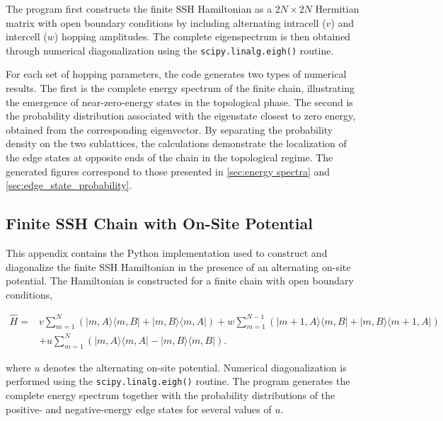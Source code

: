 \documentclass[11pt, a4paper]{article}
\begin{document}
The program first constructs the finite SSH Hamiltonian as a \(2N\times2N\) Hermitian matrix with open boundary conditions by including alternating intracell (\(v\)) and intercell (\(w\)) hopping amplitudes. The complete eigenspectrum is then obtained through numerical diagonalization using the \texttt{scipy.linalg.eigh()} routine.

For each set of hopping parameters, the code generates two types of numerical results. The first is the complete energy spectrum of the finite chain, illustrating the emergence of near-zero-energy states in the topological phase. The second is the probability distribution associated with the eigenstate closest to zero energy, obtained from the corresponding eigenvector. By separating the probability density on the two sublattices, the calculations demonstrate the localization of the edge states at opposite ends of the chain in the topological regime. The generated figures correspond to those presented in \cref{sec:energy spectra} and \cref{sec:edge_state_probability}.

\subsection{Finite SSH Chain with On-Site Potential}

This appendix contains the Python implementation used to construct and diagonalize the finite SSH Hamiltonian in the presence of an alternating on-site potential. The Hamiltonian is constructed for a finite chain with open boundary conditions,

\begin{align}
\hat H
={}&
v\sum_{m=1}^{N}
\left(
|m,A\rangle\langle m,B|
+
|m,B\rangle\langle m,A|
\right)
+
w\sum_{m=1}^{N-1}
\left(
|m+1,A\rangle\langle m,B|
+
|m,B\rangle\langle m+1,A|
\right)
\nonumber\\[0.5em]
&+
u\sum_{m=1}^{N}
\left(
|m,A\rangle\langle m,A|
-
|m,B\rangle\langle m,B|
\right).
\end{align}

where \(u\) denotes the alternating on-site potential. Numerical diagonalization is performed using the \texttt{scipy.linalg.eigh()} routine. The program generates the complete energy spectrum together with the probability distributions of the positive- and negative-energy edge states for several values of \(u\).
\end{document}
